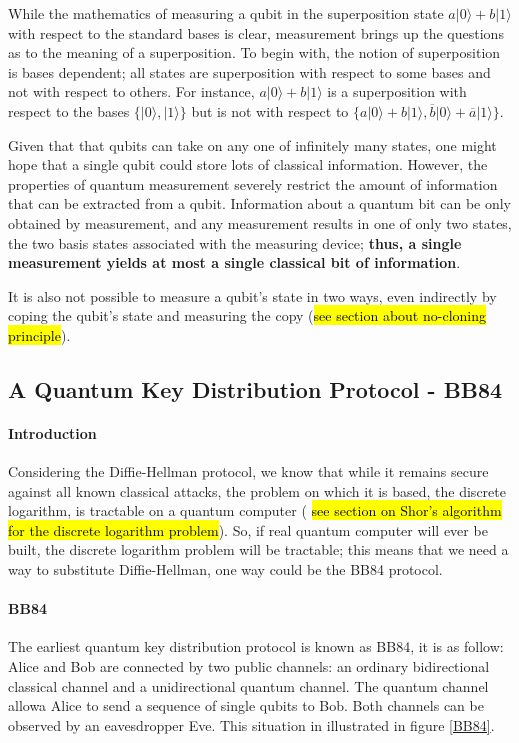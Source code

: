 \documentclass[12pt,a4paper]{report}
\begin{document}
While the mathematics of measuring a qubit in the superposition state
$ a \vert 0 \rangle + b \vert 1 \rangle $
with respect to the standard bases is clear, measurement brings up the questions as to the meaning of a superposition. To begin with, the notion of superposition is bases dependent; all states are superposition with respect to some bases and not with respect to others. For instance,
$ a \vert 0 \rangle + b \vert 1 \rangle $
is a  superposition with respect to the bases
$ \lbrace | 0 \rangle, | 1 \rangle \rbrace $
but is not with respect to
$ \lbrace a \vert 0 \rangle + b \vert 1 \rangle, \overline{b} \vert 0 \rangle + \overline{a} \vert 1 \rangle \rbrace $.

Given that that qubits can take on any one of infinitely many states, one might hope that a single qubit could store lots of classical information. However, the properties of quantum measurement severely restrict the amount of information that can be extracted from a qubit. Information about a quantum bit can be only obtained by measurement, and any measurement results in one of only two states, the two basis states associated with the measuring device; \textbf{thus, a single measurement yields at most a single classical bit of information}.

It is also not possible to measure a qubit's state in two ways, even indirectly by coping the qubit's state and measuring the copy (\hl{see section about no-cloning principle}).

\subsection{A Quantum Key Distribution Protocol - BB84}
\paragraph{Introduction}
Considering the Diffie-Hellman protocol, we know that while it remains secure against all known classical attacks, the problem on which it is based, the discrete logarithm, is tractable on a quantum computer ( \hl{see section on Shor's algorithm for the discrete logarithm problem}). So, if real quantum computer will ever be built, the discrete logarithm problem will be tractable; this means that we need a way to substitute Diffie-Hellman, one way could be the BB84 protocol.

\paragraph{BB84}
The earliest quantum key distribution protocol is known as BB84, it is as follow: Alice and Bob are connected by two public channels: an ordinary bidirectional classical channel and a unidirectional quantum channel. The quantum channel allowa Alice to send a sequence of single qubits to Bob. Both channels can be observed by an eavesdropper Eve. This situation in illustrated in figure \ref{BB84}.
\end{document}
